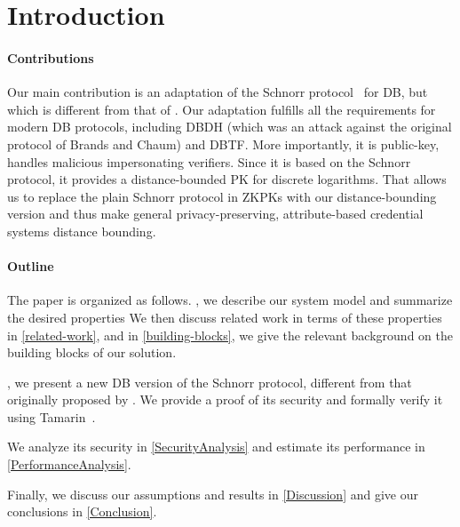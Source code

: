 \section{Introduction}%
\label{Introduction}



\paragraph*{Contributions}



Our main contribution is an adaptation of the Schnorr protocol~\cite{Schnorr} for \ac{DB}, but which is different from that of \textcite{DistanceBounding}.
Our adaptation fulfills all the requirements for modern \ac{DB} protocols, 
including \ac{DBDH} (which was an attack against the original protocol of 
Brands and Chaum) and \ac{DBTF}.
More importantly, it is public-key, handles malicious impersonating verifiers.
Since it is based on the Schnorr protocol, it provides a distance-bounded 
\ac{PK} for discrete logarithms.
That allows us to replace the plain Schnorr protocol in \acp{ZKPK} with our 
distance-bounding version and thus make general privacy-preserving, 
attribute-based credential systems distance bounding.

\paragraph*{Outline}

The paper is organized as follows.
, we describe our system model and summarize the desired 
properties 
We then discuss related work in terms of these properties in 
\cref{related-work}, and in \cref{building-blocks}, we give 
the relevant background on the building blocks of our solution.

, we present a new \ac{DB} version of the Schnorr protocol, 
different from that originally proposed by \textcite{DistanceBounding}.
We provide a proof of its security and formally verify it using 
Tamarin~\cite{TamarinDB}.

We analyze its security in \cref{SecurityAnalysis} and estimate its performance 
in \cref{PerformanceAnalysis}.

Finally, we discuss our assumptions and results in \cref{Discussion} and give 
our conclusions in \cref{Conclusion}.
